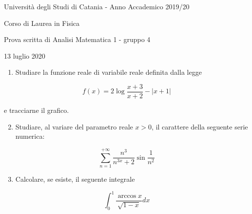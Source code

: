 \documentclass[10pt]{article}
\begin{document}
Università degli Studi di Catania - Anno Accademico 2019/20

Corso di Laurea in Fisica

Prova scritta di Analisi Matematica 1 - gruppo 4

13 luglio 2020

\begin{enumerate}
  \item Studiare la funzione reale di variabile reale definita dalla legge
\end{enumerate}

\[
f(x)=2 \log \frac{x+3}{x+2}-|x+1|
\]

e tracciarne il grafico.

\begin{enumerate}
  \setcounter{enumi}{1}
  \item Studiare, al variare del parametro reale \(x>0\), il carattere della seguente serie numerica:
\end{enumerate}

\[
\sum_{n=1}^{+\infty} \frac{n^{3}}{n^{3 x}+2} \sin \frac{1}{n^{2}}
\]

\begin{enumerate}
  \setcounter{enumi}{2}
  \item Calcolare, se esiste, il seguente integrale
\end{enumerate}

\[
\int_{0}^{1} \frac{\arccos x}{\sqrt{1-x}} d x
\]
\end{document}
